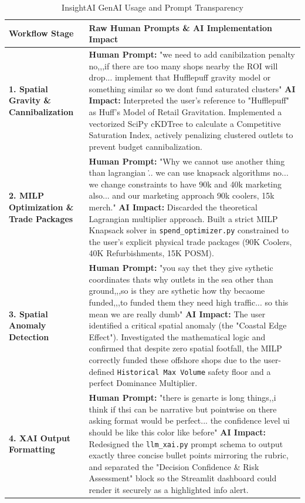 \documentclass[10pt,a4paper]{article}
\begin{document}
\begin{table}[H]
    \centering
    \scriptsize
    \caption{InsightAI GenAI Usage and Prompt Transparency}
    \begin{tabular}{|p{}|p{}|}
        \hline
        \textbf{Workflow Stage} & \textbf{Raw Human Prompts \& AI Implementation Impact} \\ \hline
        \textbf{1. Spatial Gravity \& Cannibalization} & 
        \textbf{Human Prompt:} "we need to add canibilzation penalty no,,,if there are too many shops nearby the ROI will drop... implement that Hufflepuff gravity model or something similar so we dont fund saturated clusters" \newline 
        \textbf{AI Impact:} Interpreted the user's reference to "Hufflepuff" as Huff's Model of Retail Gravitation. Implemented a vectorized SciPy cKDTree to calculate a Competitive Saturation Index, actively penalizing clustered outlets to prevent budget cannibalization. \\ \hline
        
        \textbf{2. MILP Optimization \& Trade Packages} & 
        \textbf{Human Prompt:} "Why we cannot use another thing than lagrangian \... we can use knapsack algorithms no... we change constraints to have 90k and 40k marketing also... and our marketing approach 90k coolers, 15k merch." \newline 
        \textbf{AI Impact:} Discarded the theoretical Lagrangian multiplier approach. Built a strict MILP Knapsack solver in \texttt{spend\_optimizer.py} constrained to the user's explicit physical trade packages (90K Coolers, 40K Refurbishments, 15K POSM). \\ \hline
        
        \textbf{3. Spatial Anomaly Detection} & 
        \textbf{Human Prompt:} "you say thet they give sythetic coordinates thats why outlets in the sea other than ground,,,so is they are sythetic how thy becaome funded,,,to funded them they need high traffic... so this mean we are really dumb" \newline 
        \textbf{AI Impact:} The user identified a critical spatial anomaly (the "Coastal Edge Effect"). Investigated the mathematical logic and confirmed that despite zero spatial footfall, the MILP correctly funded these offshore shops due to the user-defined \texttt{Historical Max Volume} safety floor and a perfect Dominance Multiplier. \\ \hline
        
        \textbf{4. XAI Output Formatting} & 
        \textbf{Human Prompt:} "there is genarte is long things,,i think if thsi can be narrative but pointwise on there asking format would be perfect... the confidence level ui should be like this color like before" \newline 
        \textbf{AI Impact:} Redesigned the \texttt{llm\_xai.py} prompt schema to output exactly three concise bullet points mirroring the rubric, and separated the "Decision Confidence \& Risk Assessment" block so the Streamlit dashboard could render it securely as a highlighted info alert. \\ \hline
        

\end{tabular}
\end{table}
\end{document}
